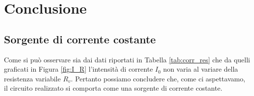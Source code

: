 \section*{Conclusione}

\subsection*{Sorgente di corrente costante}

Come si può osservare sia dai dati riportati in Tabella \ref{tab:corr_res} che da quelli graficati in Figura \ref{fig:I_R} l'intensità di corrente $I_0$ non varia al variare della resistenza variabile $R_v$. Pertanto possiamo concludere che, come ci aspettavamo, il circuito realizzato si comporta come una sorgente di corrente costante.
